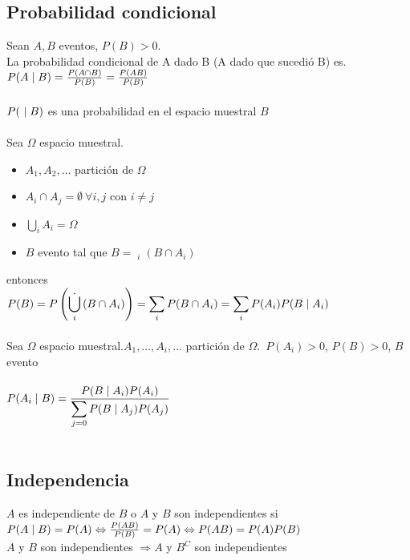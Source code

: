 \documentclass[a4paper,10pt]{article}
\begin{document}
\subsection{Probabilidad condicional}
 Sean $A,B$ eventos, $P(B) > 0$. \\
La probabilidad condicional de A dado B (A dado que sucedió B) es. \\
$P(A \mid B ) = \frac{P(A \cap B)}{P(B)} = \frac{P(AB)}{P(B)}$ \\ \\
\observacion $P(\ \mid B)$ es una probabilidad en el espacio muestral $B$ \\ \\
 Sea $\Omega$ espacio muestral.
\begin{itemize}
	\item $A_1,A_2,\dots$ partición de $\Omega$
	\item $\displaystyle A_i \cap A_j = \emptyset \ \forall i,j$ con $i \neq j$
	\item $\displaystyle \bigcup_{i} {A_i} = \Omega$
	\item $B$ evento tal que $B = \displaystyle \mathop{\dot\bigcup}_{i} {\left( B \cap A_i \right)}$
\end{itemize}
entonces \\
$\displaystyle P(B)=P \left( \displaystyle \mathop{\dot\bigcup}_{i} {\left( B \cap A_i \right)} \right)=\sum_{i} {P ( B \cap A_i )}=\sum_{i} {P(A_i)P(B \mid A_i)}$ \\ \\
 Sea $\Omega$ espacio muestral.$A_1,\dots,A_i,\dots$ partición de $\Omega$.\ $P(A_i) > 0$, $P(B) > 0$, $B$ evento \\ \\
$P(A_i \mid B) = \displaystyle \frac {P(B \mid A_i)P(A_i)} {\displaystyle\sum_{j=0}{P(B \mid A_j)P(A_j)}}$ \\ \\

\subsection{Independencia}

 $A$ es independiente de $B$ o $A$ y $B$ son independientes si \\
$P(A \mid B) = P(A) \Leftrightarrow \frac{P(AB)}{P(B)} = P(A) \Leftrightarrow P(AB) = P(A)P(B)$ \\ 

\propiedad $A$ y $B$ son independientes $ \Rightarrow A$ y $B^C$ son independientes \\ 
\end{document}
